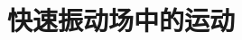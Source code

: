 \documentclass[11pt,a4paper]{article}
\begin{document}
\section{快速振动场中的运动}
\cite{2007理论物理学教程} 

























































































\end{document}
